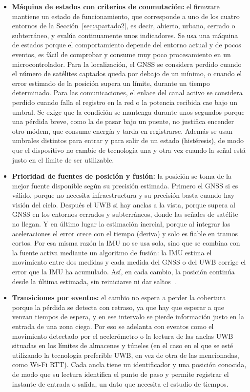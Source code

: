 \documentclass[11pt,a4paper]{article}
\begin{document}
\begin{itemize}
    \item \textbf{Máquina de estados con criterios de conmutación:} el firmware mantiene un estado de funcionamiento, que corresponde a uno de los cuatro entornos de la Sección~\ref{sec:apartado2}, es decir, abierto, urbano, cerrado o subterráneo, y evalúa continuamente unos indicadores. Se usa una máquina de estados porque el comportamiento depende del entorno actual y de pocos eventos, es fácil de comprobar y consume muy poco procesamiento en un microcontrolador. Para la localización, el GNSS se considera perdido cuando el número de satélites captados queda por debajo de un mínimo, o cuando el error estimado de la posición supera un límite, durante un tiempo determinado. Para las comunicaciones, el enlace del canal activo se considera perdido cuando falla el registro en la red o la potencia recibida cae bajo un umbral. Se exige que la condición se mantenga durante unos segundos porque una pérdida breve, como la de pasar bajo un puente, no justifica encender otro módem, que consume energía y tarda en registrarse. Además se usan umbrales distintos para entrar y para salir de un estado (histéresis), de modo que el dispositivo no cambie de tecnología una y otra vez cuando la señal está justo en el límite de ser utilizable.

    \item \textbf{Prioridad de fuentes de posición y fusión:} la posición se toma de la mejor fuente disponible según su precisión estimada. Primero el GNSS si es válido, porque no necesita infraestructura y su precisión basta cuando hay visión del cielo. Después el UWB si hay anclas a la vista, porque supera al GNSS en los entornos cerrados y subterráneos, donde las señales de satélite no llegan. Y en último lugar la estimación inercial, porque al integrar las aceleraciones el error crece con el tiempo (deriva) y solo es fiable en tramos cortos. Por esa misma razón la IMU no se usa sola, sino que se combina con la fuente activa mediante un algoritmo de fusión: la IMU estima el movimiento entre dos medidas y cada medida del GNSS o del UWB corrige el error que la IMU ha acumulado. Así, en cada cambio, la posición continúa desde la última estimada, sin reiniciarse ni dar saltos~\cite{ref14}.

    \item \textbf{Transiciones por eventos:} el cambio no espera a perder la cobertura porque la pérdida se detecta con retraso, ya que hay que esperar a que venzan tiempos de espera, y en ese intervalo se pierde información justo en la entrada de una zona ciega. Por eso se adelanta con eventos como el movimiento detectado por el acelerómetro o la lectura de las anclas UWB situadas en los límites de almacenes y túneles (en el caso en el que se esté utilizando la tecnología preferible UWB, en vez de otra de las mencionadas, como Wi-Fi RTT). Cada ancla tiene un identificador y una posición conocida, de modo que su lectura identifica el punto de paso y permite registrar el instante de entrada o salida, un dato que necesita el estudio de tiempos.


\end{itemize}
\end{document}
